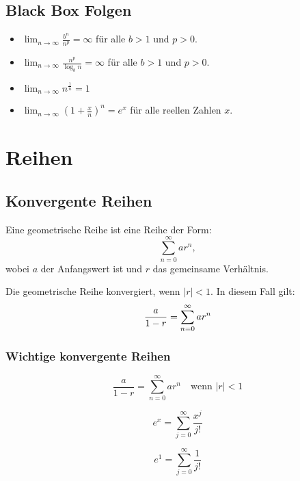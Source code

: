 \documentclass[11pt, openany]{book}
\begin{document}
\subsection{Black Box Folgen}
\begin{tcolorbox}
\begin{itemize}
    \item $\lim_{n \to \infty} \frac{b^n}{n^p} = \infty$ für alle $b > 1$ und $p > 0$.
    \item $\lim_{n \to \infty} \frac{n^p}{\log_b n} = \infty$ für alle $b > 1$ und $p > 0$.
    \item $\lim_{n \to \infty} n^{\frac{1}{n}} = 1$
    \item $\lim_{n \to \infty} \left(1 + \frac{x}{n}\right)^n = e^x$ für alle reellen Zahlen $x$.
\end{itemize}    
\end{tcolorbox}


\newpage

\section{Reihen}

\subsection{Konvergente Reihen}
Eine geometrische Reihe ist eine Reihe der Form:
\[
\sum_{n=0}^{\infty} ar^n,
\]
wobei $a$ der Anfangswert ist und $r$ das gemeinsame Verhältnis.

Die geometrische Reihe konvergiert, wenn $|r| < 1$. In diesem Fall gilt:
\[
       \frac{a}{1-r} = \sum_{n=0}^{\infty} ar^n \\
\]
\subsubsection{Wichtige konvergente Reihen}
\begin{tcolorbox}
\begin{minipage}{0.3\textwidth}
\[
\frac{a}{1-r} = \sum_{n=0}^{\infty} ar^n \quad \text{wenn } |r| < 1
\]
\end{minipage}
\quad
\begin{minipage}{0.3\textwidth}
\[
e^x = \sum_{j = 0}^{\infty} \frac{x^j}{j!}
\]
\end{minipage}
\quad
\begin{minipage}{0.3\textwidth}
\[
e^1 = \sum_{j = 0}^{\infty} \frac{1}{j!}
\]
\end{minipage}
\end{tcolorbox}
\end{document}
